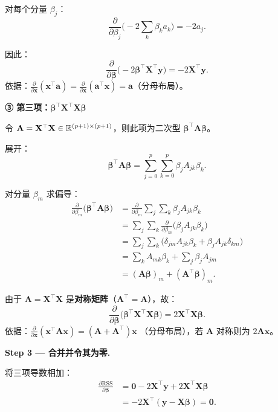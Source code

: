 对每个分量 $\beta_j$：
\[
    \frac{\partial}{\partial \beta_j}\big(-2\sum_{k} \beta_k a_k\big) = -2 a_j.
\]

因此：
\[
    \boxed{\frac{\partial}{\partial \bm{\beta}}\big(-2\bm{\beta}^\top \mathbf{X}^\top \mathbf{y}\big)
    = -2\mathbf{X}^\top \mathbf{y}}.
\]
依据：$\frac{\partial}{\partial \mathbf{x}}(\mathbf{x}^\top \mathbf{a}) = \frac{\partial}{\partial \mathbf{x}}(\mathbf{a}^\top \mathbf{x}) = \mathbf{a}$（分母布局）。

\medskip
\noindent\textbf{③ 第三项：$\bm{\beta}^\top \mathbf{X}^\top \mathbf{X} \bm{\beta}$}

令 $\mathbf{A} = \mathbf{X}^\top \mathbf{X} \in \mathbb{R}^{(p+1) \times (p+1)}$，则此项为二次型 $\bm{\beta}^\top \mathbf{A} \bm{\beta}$。

展开：
\[
    \bm{\beta}^\top \mathbf{A} \bm{\beta}
    = \sum_{j=0}^{p} \sum_{k=0}^{p} \beta_j A_{jk} \beta_k.
\]

对分量 $\beta_m$ 求偏导：
\begin{align}
    \frac{\partial}{\partial \beta_m}\big(\bm{\beta}^\top \mathbf{A} \bm{\beta}\big)
    &= \frac{\partial}{\partial \beta_m} \sum_{j} \sum_{k} \beta_j A_{jk} \beta_k \nonumber\\
    &= \sum_{j} \sum_{k} \frac{\partial}{\partial \beta_m}\big(\beta_j A_{jk} \beta_k\big) \nonumber\\
    &= \sum_{j} \sum_{k} \Big(
         \delta_{jm} A_{jk} \beta_k + \beta_j A_{jk} \delta_{km}
       \Big) \nonumber\\
    &= \sum_{k} A_{mk} \beta_k + \sum_{j} \beta_j A_{jm} \nonumber\\
    &= (\mathbf{A}\bm{\beta})_m + (\mathbf{A}^\top \bm{\beta})_m. \label{eq:quad_deriv}
\end{align}

由于 $\mathbf{A} = \mathbf{X}^\top \mathbf{X}$ 是\textbf{对称矩阵}（$\mathbf{A}^\top = \mathbf{A}$），故：
\[
    \boxed{\frac{\partial}{\partial \bm{\beta}}\big(\bm{\beta}^\top \mathbf{X}^\top \mathbf{X} \bm{\beta}\big)
    = 2\mathbf{X}^\top \mathbf{X} \bm{\beta}}.
\]
依据：$\frac{\partial}{\partial \mathbf{x}}(\mathbf{x}^\top \mathbf{A} \mathbf{x}) = (\mathbf{A} + \mathbf{A}^\top)\mathbf{x}$
（分母布局），若 $\mathbf{A}$ 对称则为 $2\mathbf{A}\mathbf{x}$。

\medskip
\textbf{Step 3 --- 合并并令其为零.}

将三项导数相加：
\begin{align}
    \frac{\partial \mathrm{RSS}}{\partial \bm{\beta}}
    &= \mathbf{0} - 2\mathbf{X}^\top \mathbf{y} + 2\mathbf{X}^\top \mathbf{X} \bm{\beta} \nonumber\\
    &= -2\mathbf{X}^\top (\mathbf{y} - \mathbf{X}\bm{\beta}) = \mathbf{0}. \label{eq:rss_deriv_full}
\end{align}

